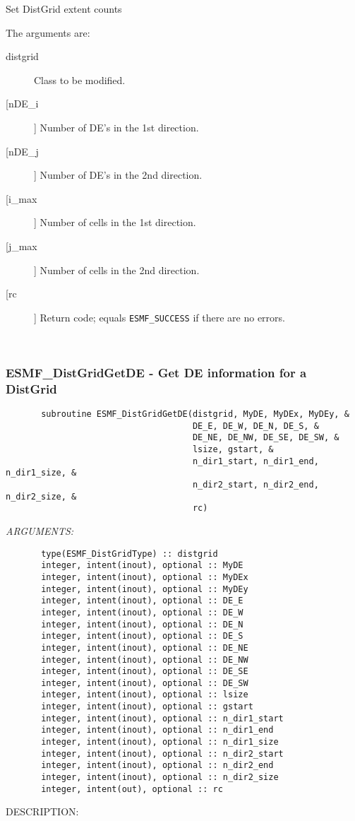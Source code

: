        Set DistGrid extent counts
  
       The arguments are:
       \begin{description}
       \item[distgrid] 
            Class to be modified.
       \item[[nDE\_i]]
            Number of DE's in the 1st direction.
       \item[[nDE\_j]]
            Number of DE's in the 2nd direction.
       \item[[i\_max]]
            Number of cells in the 1st direction.
       \item[[j\_max]]
            Number of cells in the 2nd direction.
       \item[[rc]] 
            Return code; equals {\tt ESMF\_SUCCESS} if there are no errors.
       \end{description}
   
 
\mbox{}\hrulefill\ 
 
\subsubsection{ESMF\_DistGridGetDE - Get DE information for a DistGrid}


 
\begin{verbatim}       subroutine ESMF_DistGridGetDE(distgrid, MyDE, MyDEx, MyDEy, &
                                     DE_E, DE_W, DE_N, DE_S, &
                                     DE_NE, DE_NW, DE_SE, DE_SW, &
                                     lsize, gstart, &
                                     n_dir1_start, n_dir1_end, n_dir1_size, &
                                     n_dir2_start, n_dir2_end, n_dir2_size, &
                                     rc)\end{verbatim}{\em ARGUMENTS:}
\begin{verbatim}       type(ESMF_DistGridType) :: distgrid
       integer, intent(inout), optional :: MyDE
       integer, intent(inout), optional :: MyDEx
       integer, intent(inout), optional :: MyDEy
       integer, intent(inout), optional :: DE_E
       integer, intent(inout), optional :: DE_W
       integer, intent(inout), optional :: DE_N
       integer, intent(inout), optional :: DE_S
       integer, intent(inout), optional :: DE_NE
       integer, intent(inout), optional :: DE_NW
       integer, intent(inout), optional :: DE_SE
       integer, intent(inout), optional :: DE_SW
       integer, intent(inout), optional :: lsize
       integer, intent(inout), optional :: gstart
       integer, intent(inout), optional :: n_dir1_start
       integer, intent(inout), optional :: n_dir1_end
       integer, intent(inout), optional :: n_dir1_size
       integer, intent(inout), optional :: n_dir2_start
       integer, intent(inout), optional :: n_dir2_end
       integer, intent(inout), optional :: n_dir2_size
       integer, intent(out), optional :: rc            
 \end{verbatim}
{\sf DESCRIPTION:\\ }


